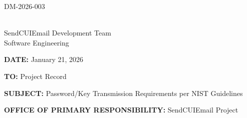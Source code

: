 \documentclass[11pt,letterpaper]{article}
\newcommand{\UniqueID}{DM-2026-003}
\newcommand{\DocumentDate}{January 21, 2026}
\newcommand{\AuthorName}{SendCUIEmail Development Team}
\newcommand{\AuthorTitle}{Software Engineering}
\newcommand{\ToField}{Project Record}
\newcommand{\SubjectField}{Password/Key Transmission Requirements per NIST Guidelines}
\newcommand{\OPRField}{SendCUIEmail Project}
\begin{document}
\hfill \UniqueID

\vspace{0.25in}

\underline{\hspace{2.5in}}\\[2pt]
\AuthorName\\
\AuthorTitle

\vspace{0.25in}

\textbf{DATE:} \DocumentDate

\textbf{TO:} \ToField

\textbf{SUBJECT:} \SubjectField

\textbf{OFFICE OF PRIMARY RESPONSIBILITY:} \OPRField

\vspace{0.25in}
\end{document}
